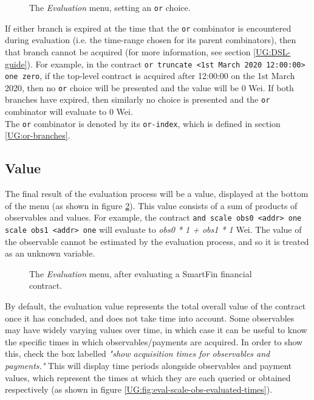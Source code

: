\documentclass{article}
\begin{document}
\begin{figure}[h]
    \centering
    \caption{The \textit{Evaluation} menu, setting an \texttt{or} choice.}
    \label{UG:fig:eval-or-select}
\end{figure}

If either branch is expired at the time that the \texttt{or} combinator is encountered during evaluation (i.e. the time-range chosen for its parent combinators), then that branch cannot be acquired (for more information, see section \ref{UG:DSL-guide}). For example, in the contract \texttt{or truncate <1st March 2020 12:00:00> one zero}, if the top-level contract is acquired after 12:00:00 on the 1st March 2020, then no \texttt{or} choice will be presented and the value will be 0 Wei. If both branches have expired, then similarly no choice is presented and the \texttt{or} combinator will evaluate to 0 Wei. \\

The \texttt{or} combinator is denoted by its \texttt{or-index}, which is defined in section \ref{UG:or-branches}.


\subsection{Value}

The final result of the evaluation process will be a value, displayed at the bottom of the menu (as shown in figure \ref{UG:fig:eval-scale-obs-evaluated}). This value consists of a sum of products of observables and values. For example, the contract \texttt{and scale obs0 <addr> one scale obs1 <addr> one} will evaluate to \textit{obs0 * 1 + obs1 * 1} Wei. The value of the observable cannot be estimated by the evaluation process, and so it is treated as an unknown variable.

\begin{figure}[h]
    \centering
    \caption{The \textit{Evaluation} menu, after evaluating a SmartFin financial contract.}
    \label{UG:fig:eval-scale-obs-evaluated}
\end{figure}

By default, the evaluation value represents the total overall value of the contract once it has concluded, and does not take time into account. Some observables may have widely varying values over time, in which case it can be useful to know the specific times in which observables/payments are acquired. In order to show this, check the box labelled \textit{"show acquisition times for observables and payments."} This will display time periods alongside observables and payment values, which represent the times at which they are each queried or obtained respectively (as shown in figure \ref{UG:fig:eval-scale-obs-evaluated-times}).
\end{document}
